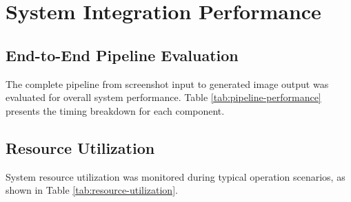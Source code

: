 \section{System Integration Performance}
\label{sec:system-integration}

\subsection{End-to-End Pipeline Evaluation}

The complete pipeline from screenshot input to generated image output was evaluated for overall system performance. Table \ref{tab:pipeline-performance} presents the timing breakdown for each component.

\begin{table}[h!]
\centering
\caption{End-to-End Pipeline Performance Breakdown}
\label{tab:pipeline-performance}
\end{table}

\subsection{Resource Utilization}

System resource utilization was monitored during typical operation scenarios, as shown in Table \ref{tab:resource-utilization}.

